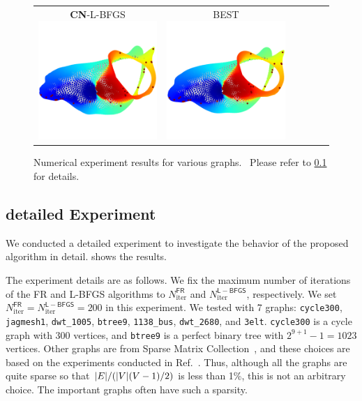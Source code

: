 \documentclass[dvipdfmx,10pt,journal,compsoc]{IEEEtran}
\begin{document}
\begin{figure}[btp]
\begin{tabular}{cccccc}
    \makecell{\small{\textsf{\textbf{CN}-L-BFGS}}                                                                                                        \\[-0.2em]\includegraphics[width=0.27\columnwidth]{individual/vis/3elt_CN-L-BFGS.png}} &
    \makecell{\small{\textsf{BEST}}                                                                                                                      \\[-0.2em]\includegraphics[width=0.27\columnwidth]{individual/vis/opt_3elt.png}} \\
  \end{tabular}
  \caption{Numerical experiment results for various graphs.  Please refer to \cref{ssec:exprDetail} for details.}
  \label{fig:individual}
\end{figure}

\subsection{detailed Experiment}\label{ssec:exprDetail}

We conducted a detailed experiment to investigate the behavior of the proposed algorithm in detail.  shows the results.

The experiment details are as follows.
We fix the maximum number of iterations of the FR and L-BFGS algorithms to $N_\mathrm{iter}^\mathsf{FR}$ and $N_\mathrm{iter}^{\mathsf{L-BFGS}}$, respectively.
We set $N_\mathrm{iter}^\mathsf{FR} = N_\mathrm{iter}^\mathsf{L-BFGS} = 200$ in this experiment.
We tested with 7 graphs: \texttt{cycle300}, \texttt{jagmesh1}, \texttt{dwt\_1005}, \texttt{btree9}, \texttt{1138\_bus}, \texttt{dwt\_2680}, and \texttt{3elt}. \texttt{cycle300} is a cycle graph with 300 vertices, and \texttt{btree9} is a perfect binary tree with $2^{9+1}-1=1023$ vertices. Other graphs are from Sparse Matrix Collection~\cite{davis2011university}, and these choices are based on the experiments conducted in Ref.~\cite{zhengGraphDrawingStochastic2019}. Thus, although all the graphs are quite sparse so that $\abs{E} / (\abs{V}(V-1)/2)$ is less than 1\%, this is not an arbitrary choice. The important graphs often have such a sparsity.
\end{document}
